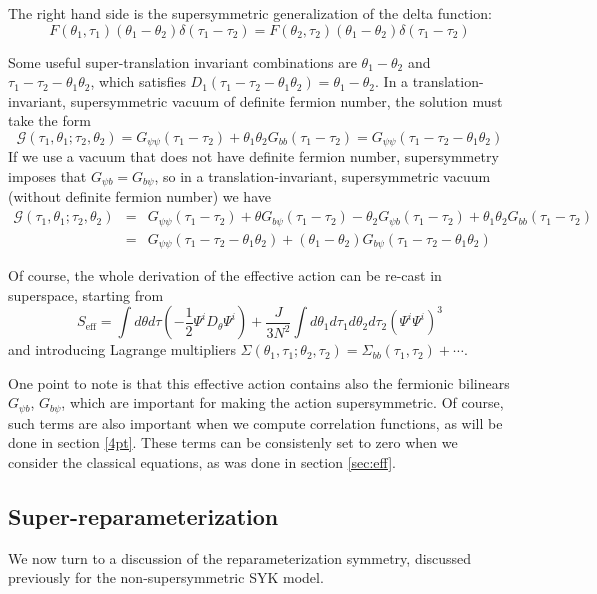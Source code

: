\documentclass[aps,pre,preprint,onecolumn,citeautoscript,superscriptaddress,nofootinbib,eqsecnum]{revtex4-1}
\newcommand{\beq}{\begin{equation}}
\newcommand{\eeq}{\end{equation}}
\def\bea{\begin{eqnarray}}
\def\eea{\end{eqnarray}}
\begin{document}
The right hand side is the supersymmetric generalization of the delta function:
\begin{equation}
F(\theta_1, \tau_1) (\theta_1-\theta_2)\delta(\tau_1-\tau_2) = F(\theta_2, \tau_2) (\theta_1-\theta_2)\delta(\tau_1-\tau_2)
\end{equation}

Some useful super-translation invariant combinations are $\theta_1 - \theta_2$ and $\tau_1 - \tau_2 - \theta_1 \theta_2$, 
which satisfies $D_1(\tau_1 - \tau_2 - \theta_1 \theta_2) = \theta_1 - \theta_2$. 
In a translation-invariant, supersymmetric vacuum of definite fermion number, the solution must take the form
\beq
\mathcal{G}(\tau_1,\theta_1;\tau_2,\theta_2)=G_{\psi \psi}(\tau_1-\tau_2)+\theta_1\theta_2G_{bb}(\tau_1-\tau_2)=G_{\psi \psi}(\tau_1-\tau_2-\theta_1\theta_2)
\eeq
If we use a vacuum that does not have definite fermion number, supersymmetry imposes that $G_{\psi b}=G_{b \psi}$, so in a translation-invariant, supersymmetric vacuum (without definite fermion number) we have
\bea
\mathcal{G}(\tau_1,\theta_1;\tau_2,\theta_2)&=&G_{\psi \psi}(\tau_1-\tau_2)+\theta G_{b \psi}(\tau_1-\tau_2)-\theta_2 G_{\psi b}(\tau_1-\tau_2)+\theta_1\theta_2G_{bb}(\tau_1-\tau_2)\nonumber\\
&=&
G_{\psi \psi}(\tau_1-\tau_2-\theta_1\theta_2)+(\theta_1-\theta_2)G_{b \psi}(\tau_1-\tau_2-\theta_1\theta_2)
\eea

Of course, the whole derivation of the effective action can be re-cast in superspace, starting from 
\beq
S_{\mathrm{eff}}=\int d\theta d \tau (-\frac{1}{2}\Psi^iD_{\theta}\Psi^i) + \frac{J}{3 N^2}\int d\theta_1 d \tau_1d\theta_2 d \tau_2 \left(\Psi^i \Psi^i \right)^3
\eeq
and introducing Lagrange multipliers $\Sigma(\theta_1, \tau_1;\theta_2, \tau_2) = \Sigma_{bb}(\tau_1, \tau_2) + \cdots$. 

One point to note is that this effective action contains also the fermionic 
bilinears $G_{\psi b}$, $G_{b\psi}$, which are important for making the action supersymmetric. Of course, such terms are also important when we compute 
correlation functions, as will be done in section \ref{4pt}. These terms can be consistenly set to zero when we consider the classical equations, as was done in 
section \ref{sec:eff}. 

\subsection{Super-reparameterization}

We now turn to a discussion of the reparameterization symmetry, discussed previously \cite{PG98,kitaev2015talk,SS15,JMDS16}
for the non-supersymmetric SYK model.
\end{document}
